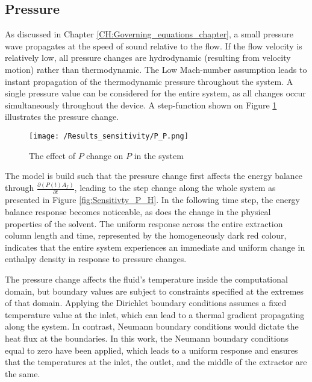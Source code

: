 \documentclass[../Article_Sensitivity_Analsysis.tex]{subfiles}
\begin{document}
	
	\subsection{Pressure}
	
	As discussed in Chapter \ref{CH:Governing_equations_chapter}, a small pressure wave propagates at the speed of sound relative to the flow. If the flow velocity is relatively low, all pressure changes are hydrodynamic (resulting from velocity motion) rather than thermodynamic. The Low Mach-number assumption leads to instant propagation of the thermodynamic pressure throughout the system. A single pressure value can be considered for the entire system, as all changes occur simultaneously throughout the device. A step-function shown on Figure \ref{fig:Sensitivty_P_P} illustrates the pressure change.
	
	\begin{figure}[h!]
		\centering
		\texttt{[image: /Results\_sensitivity/P\_P.png]}
		\caption{The effect of $P$ change on $P$ in the system}
		\label{fig:Sensitivty_P_P}
	\end{figure}
	
	
	The model is build such that the pressure change first affects the energy balance through $\frac{\partial (P(t) A_f)}{\partial t}$, leading to the step change along the whole system as presented in Figure \ref{fig:Sensitivty_P_H}. In the following time step, the energy balance response becomes noticeable, as does the change in the physical properties of the solvent. The uniform response across the entire extraction column length and time, represented by the homogeneously dark red colour, indicates that the entire system experiences an immediate and uniform change in enthalpy density in response to pressure changes. 
	
	The pressure change affects the fluid's temperature inside the computational domain, but boundary values are subject to constraints specified at the extremes of that domain. Applying the Dirichlet boundary conditions assumes a fixed temperature value at the inlet, which can lead to a thermal gradient propagating along the system. In contrast, Neumann boundary conditions would dictate the heat flux at the boundaries. In this work, the Neumann boundary conditions equal to zero have been applied, which leads to a uniform response and ensures that the temperatures at the inlet, the outlet, and the middle of the extractor are the same.
	
\end{document}
